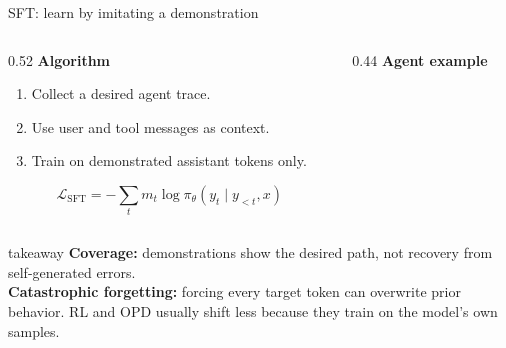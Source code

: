 \begin{frame}[t]{SFT: learn by imitating a demonstration}
  \begin{columns}[T,onlytextwidth]
    \begin{column}{0.52\textwidth}
      {\large\textbf{Algorithm}}
      \begin{enumerate}
        \item Collect a desired agent trace.
        \item Use user and tool messages as context.
        \item Train on demonstrated assistant tokens only.
      \end{enumerate}

      \vspace{3mm}
      \[
        \mathcal L_{\mathrm{SFT}}
        =-\sum_t m_t\log \pi_\theta(y_t\mid y_{<t},x)
      \]
    \end{column}
    \begin{column}{0.44\textwidth}
      {\large\textbf{Agent example}}
      \vspace{2mm}
    \end{column}
  \end{columns}

  \vspace{1mm}
  \begin{beamercolorbox}[wd=\textwidth,sep=1.2mm]{takeaway}
    \small
    \textcolor{DeckRed}{\textbf{Coverage:}} demonstrations show the desired path, not recovery from self-generated errors.\\[0.7mm]
    \textcolor{DeckRed}{\textbf{Catastrophic forgetting:}} forcing every target token can overwrite prior behavior. RL and OPD usually shift less because they train on the model's own samples.
  \end{beamercolorbox}
\end{frame}
